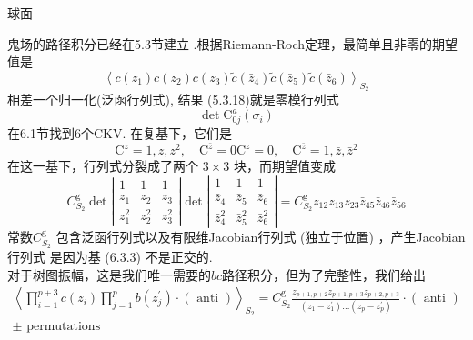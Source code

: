 \centerline{\Large 球面}
鬼场的路径积分已经在5.3节建立 .根据Riemann-Roch定理，最简单且非零的期望值是
\begin{equation}
	\left\langle c\left(z_{1}\right) c\left(z_{2}\right) c\left(z_{3}\right) \tilde{c}\left(\bar{z}_{4}\right) \tilde{c}\left(\bar{z}_{5}\right) \tilde{c}\left(\bar{z}_{6}\right)\right\rangle_{S_{2}}
\end{equation}
相差一个归一化(泛函行列式), 结果 (5.3.18)就是零模行列式
\begin{equation}
	\operatorname{det} \mathrm{C}_{0 j}^{a}\left(\sigma_{i}\right)
\end{equation}
在6.1节找到6个CKV. 在复基下，它们是
\begin{subequations}
\begin{equation}
\mathrm{C}^{z}=1, z, z^{2}, \quad \mathrm{C}^{\bar{z}}=0 
\end{equation}	
\begin{equation}
\mathrm{C}^{z}=0, \quad \mathrm{C}^{\bar{z}}=1, \bar{z}, \bar{z}^{2}
\end{equation}
\end{subequations}
在这一基下，行列式分裂成了两个 $3 \times 3$ 块，而期望值变成
\begin{equation}
	C_{S_{2}}^{\mathrm{g}} \operatorname{det}\left|\begin{array}{ccc}
		1 & 1 & 1 \\
		z_{1} & z_{2} & z_{3} \\
		z_{1}^{2} & z_{2}^{2} & z_{3}^{2}
	\end{array}\right| \operatorname{det}\left|\begin{array}{ccc}
		1 & 1 & 1 \\
		\bar{z}_{4} & \bar{z}_{5} & \bar{z}_{6} \\
		\bar{z}_{4}^{2} & \bar{z}_{5}^{2} & \bar{z}_{6}^{2}
	\end{array}\right|=C_{S_{2}}^{\mathrm{g}} z_{12} z_{13} z_{23} \bar{z}_{45} \bar{z}_{46} \bar{z}_{56}
\end{equation}
常数$C_{S_{2}}^{\mathrm{g}}$ 包含泛函行列式以及有限维Jacobian行列式 (独立于位置) ，产生Jacobian行列式 是因为基 (6.3.3) 不是正交的. \\
对于树图振幅，这是我们唯一需要的$b c$路径积分，但为了完整性，我们给出
\begin{equation}
\begin{array}{r}
\left\langle\prod_{i=1}^{p+3} c\left(z_{i}\right) \prod_{j=1}^{p} b\left(z_{j}^{\prime}\right) \cdot(\text { anti })\right\rangle_{S_{2}}=C_{S_{2}}^{\mathrm{g}} \frac{z_{p+1, p+2} z_{p+1, p+3} z_{p+2, p+3}}{\left(z_{1}-z_{1}^{\prime}\right) \ldots\left(z_{p}-z_{p}^{\prime}\right)} \cdot(\text { anti }) \\
\pm \text { permutations }
\end{array}
\end{equation}
